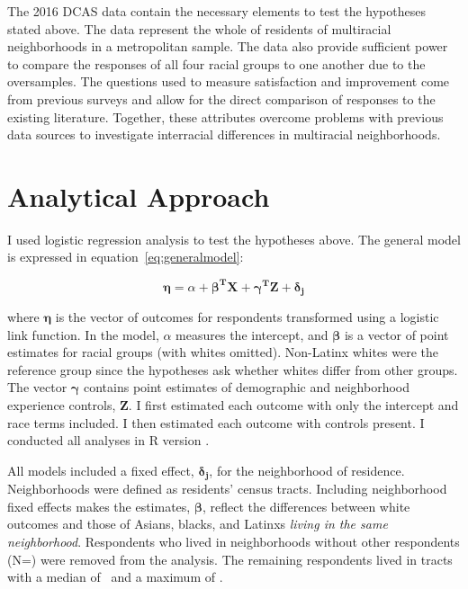 \documentclass{baderart}
\begin{document}

The 2016 DCAS data contain the necessary elements to test the hypotheses stated above. The data represent the whole of residents of multiracial neighborhoods in a metropolitan sample. The data also provide sufficient power to compare the responses of all four racial groups to one another due to the oversamples. The questions used to measure satisfaction and improvement come from previous surveys and allow for the direct comparison of responses to the existing literature. Together, these attributes overcome problems with previous data sources to investigate interracial differences in multiracial neighborhoods.

\section{Analytical Approach}\label{analytical-approach}

I used logistic regression analysis to test the hypotheses above. The general model is expressed in equation~\ref{eq:generalmodel}:

\begin{equation}
\label{eq:generalmodel}
\mathbf{\eta} = \alpha + \mathbf{\beta^T X} + \mathbf{\gamma^T Z} + \mathbf{\delta_j}
\end{equation}

\noindent where \(\mathbf{\eta}\) is the vector of outcomes for respondents transformed using a logistic link function. In the model, \(\alpha\) measures the intercept, and \(\mathbf{\beta}\) is a vector of point estimates for racial groups (with whites omitted). Non-Latinx whites were the reference group since the hypotheses ask whether whites differ from other groups. The vector \(\mathbf{\gamma}\) contains point estimates of demographic and neighborhood experience controls, \(\mathbf{Z}\). I first estimated each outcome with only the intercept and race terms included. I then estimated each outcome with controls present. I conducted all analyses in R version \Rversion.

All models included a fixed effect, \(\mathbf{\delta_j}\), for the neighborhood of residence. Neighborhoods were defined as residents' census tracts. Including neighborhood fixed effects makes the estimates, \(\mathbf{\beta}\), reflect the differences between white outcomes and those of Asians, blacks, and Latinxs \emph{living in the same neighborhood}. Respondents who lived in neighborhoods without other respondents (N=\oneresp) were removed from the analysis. The remaining respondents lived in tracts with a median of \medNpertract\ and a maximum of \maxNpertract.
\end{document}

